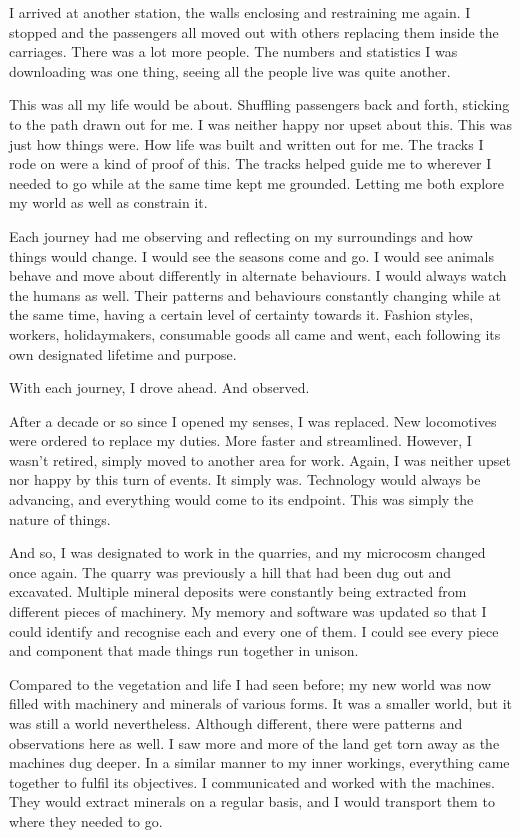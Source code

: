 I arrived at another station, the walls enclosing and restraining me again. I stopped and the passengers all moved out with others replacing them inside the carriages. There was a lot more people. The numbers and statistics I was downloading was one thing, seeing all the people live was quite another.

This was all my life would be about. Shuffling passengers back and forth, sticking to the path drawn out for me. I was neither happy nor upset about this. This was just how things were. How life was built and written out for me. The tracks I rode on were a kind of proof of this. The tracks helped guide me to wherever I needed to go while at the same time kept me grounded. Letting me both explore my world as well as constrain it. 

Each journey had me observing and reflecting on my surroundings and how things would change. I would see the seasons come and go. I would see animals behave and move about differently in alternate behaviours. I would always watch the humans as well. Their patterns and behaviours constantly changing while at the same time, having a certain level of certainty towards it. Fashion styles, workers, holidaymakers, consumable goods all came and went, each following its own designated lifetime and purpose.

With each journey, I drove ahead. And observed.

After a decade or so since I opened my senses, I was replaced. New locomotives were ordered to replace my duties. More faster and streamlined. However, I wasn't retired, simply moved to another area for work. Again, I was neither upset nor happy by this turn of events. It simply was. Technology would always be advancing, and everything would come to its endpoint. This was simply the nature of things.

And so, I was designated to work in the quarries, and my microcosm changed once again. The quarry was previously a hill that had been dug out and excavated. Multiple mineral deposits were constantly being extracted from different pieces of machinery. My memory and software was updated so that I could identify and recognise each and every one of them. I could see every piece and component that made things run together in unison.

Compared to the vegetation and life I had seen before; my new world was now filled with machinery and minerals of various forms. It was a smaller world, but it was still a world nevertheless. Although different, there were patterns and observations here as well. I saw more and more of the land get torn away as the machines dug deeper. In a similar manner to my inner workings, everything came together to fulfil its objectives. I communicated and worked with the machines. They would extract minerals on a regular basis, and I would transport them to where they needed to go. 

